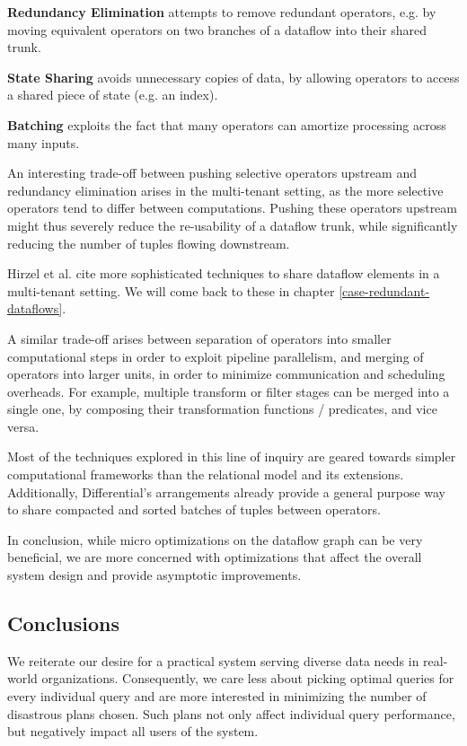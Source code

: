 \documentclass[../index.tex]{subfiles}
\begin{document}
\textbf{Redundancy Elimination} attempts to remove redundant operators,
e.g. by moving equivalent operators on two branches of a dataflow into
their shared trunk.

\textbf{State Sharing} avoids unnecessary copies of data, by allowing
operators to access a shared piece of state (e.g. an index).

\textbf{Batching} exploits the fact that many operators can amortize
processing across many inputs.

An interesting trade-off between pushing selective operators upstream
and redundancy elimination arises in the multi-tenant setting, as the
more selective operators tend to differ between computations. Pushing
these operators upstream might thus severely reduce the re-usability
of a dataflow trunk, while significantly reducing the number of tuples
flowing downstream. 

Hirzel et al. cite more sophisticated techniques to share dataflow
elements in a multi-tenant setting. We will come back to these in
chapter \ref{case-redundant-dataflows}.

A similar trade-off arises between separation of operators into
smaller computational steps in order to exploit pipeline parallelism,
and merging of operators into larger units, in order to minimize
communication and scheduling overheads. For example, multiple
transform or filter stages can be merged into a single one, by
composing their transformation functions / predicates, and vice versa.

Most of the techniques explored in this line of inquiry are geared
towards simpler computational frameworks than the relational model and
its extensions. Additionally, Differential's arrangements already
provide a general purpose way to share compacted and sorted batches of
tuples between operators.

In conclusion, while micro optimizations on the dataflow graph can be
very beneficial, we are more concerned with optimizations that affect
the overall system design and provide asymptotic improvements.

\subsection{Conclusions}

We reiterate our desire for a practical system serving diverse data
needs in real-world organizations. Consequently, we care less about
picking optimal queries for every individual query and are more
interested in minimizing the number of disastrous plans chosen. Such
plans not only affect individual query performance, but negatively
impact all users of the system.
\end{document}
